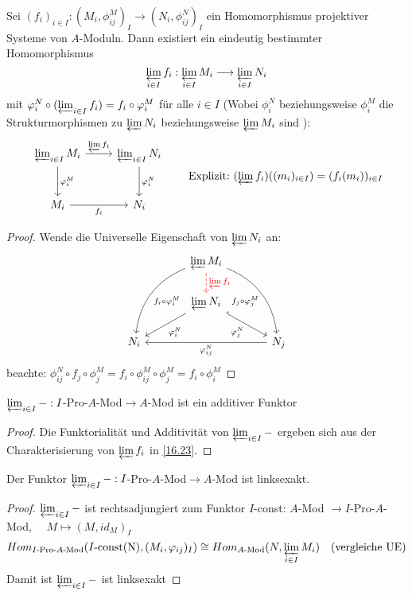 \begin{bem} \label{16.23}
	Sei $(f_i)_{i\in I}:(M_i, \phi_{ij}^M)_I \to (N_i, \phi_{ij}^N)_I$ ein Homomorphismus projektiver  Systeme von $A$-Moduln. Dann existiert ein eindeutig bestimmter Homomorphismus 
	$$\varprojlim_{i\in I} f_i: \varprojlim_{i\in I} M_i \longrightarrow \varprojlim_{i\in I} N_i$$
	mit $\phi_i^N \circ (\varprojlim_{i \in I} f_i) =  f_i \circ \phi_i^M $ für alle $i\in I$ (Wobei $\phi_i^N$ beziehungsweise $\phi_i^M $ die Strukturmorphismen zu $\varprojlim N_i $ beziehungsweise $\varprojlim M_i $ sind ):
	$$\begin{tikzcd}[row sep = large]
	\varprojlim_{i\in I}M_i \arrow{r}{\varprojlim f_i} \arrow{d}{\phi_i^M} & \varprojlim_{i\in I} N_i \arrow{d}{\phi_i^N} \\
	M_i \arrow[swap]{r}{f_i} & N_i
	\end{tikzcd}  \qquad
	\text{Explizit:} \ (\varprojlim f_i)((m_i)_{i \in I }) = (f_i(m_i))_{i \in I}$$
\end{bem}
\begin{proof}
		Wende die Universelle Eigenschaft von $\varprojlim N_i$ an:
	$$\begin{tikzcd}[column sep = large]
	& \varprojlim M_i \arrow[dashed, red]{d}{\varprojlim f_i} \arrow[bend right]{ddl}{f_i \circ \phi_i^M } \arrow[bend left, swap]{ddr}{f_j \circ \phi_j^M } &\\
	& \varprojlim N_i\arrow{dl}{\phi_i^N} \arrow[swap, hook]{dr}{\phi_j^N}& \\
	N_i & & N_j \arrow{ll}{\phi_{ij}^N} 
	\end{tikzcd}$$
	beachte: $\phi_{ij}^N \circ f_j \circ \phi_j^M = f_i \circ \phi_{ij}^M \circ \phi_j^M = f_i \circ \phi_i^M $ 
\end{proof}
\begin{fo} \label{16.24}
	$\varprojlim_{i\in I}-:I$-Pro-$A$-Mod$\to A$-Mod ist ein additiver Funktor
\end{fo}
\begin{proof}
Die Funktorialität und Additivität von $\varprojlim_{i\in I}-$ ergeben sich aus der Charakterisierung von $\varprojlim f_i$ in \ref{16.23}.
\end{proof}
\begin{sa} \label{16.25}
	Der Funktor $\varprojlim_{i\in I}-:I$-Pro-$A$-Mod$\to A$-Mod ist linksexakt.
\end{sa}
\begin{proof}
	 $\varprojlim_{i\in I}-$ ist rechtsadjungiert zum Funktor $I$-const: $A$-Mod $\to I$-Pro-$A$-Mod, $\quad M \mapsto (M, id_M)_I $ 
	 $$ Hom_{I\text{-Pro-}A\text{-Mod}}(I\text{-const(N)}, (M_i,\phi_{ij})_I) \cong Hom_{A\text{-Mod}}(N, \varprojlim_{i \in I} M_i ) \quad \text{(vergleiche UE)} $$
	 Damit ist $ \varprojlim_{i \in I }- $ ist linksexakt 
\end{proof}

